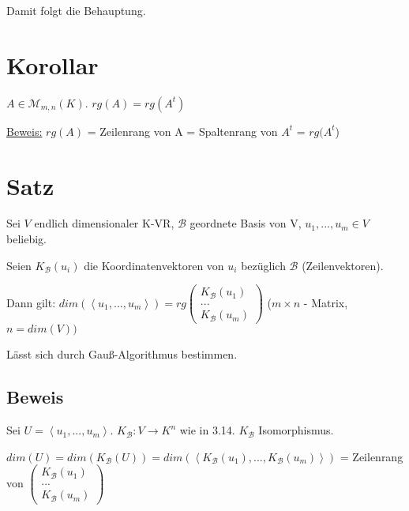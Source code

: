 \documentclass[a4paper, openany]{book}
\begin{document}
        Damit folgt die Behauptung.

        \section{Korollar}

        $A \in \mathcal{M}_{m,n} (K)$. $rg(A) = rg(A^t)$

        \par \medskip

        \underline{Beweis:} $rg(A)$ = Zeilenrang von A = Spaltenrang von $A^t$ = $rg(A^t$)

        \section{Satz}

        Sei $V$ endlich dimensionaler K-VR, $\mathcal{B}$ geordnete Basis von V, $u_1, ..., u_m \in V$ beliebig.

        Seien $K_{\mathcal{B}}(u_i)$ die Koordinatenvektoren von $u_i$ bezüglich $\mathcal{B}$ (Zeilenvektoren).

        \par \medskip

        Dann gilt: $dim(\left \langle u_1, ..., u_m \right \rangle) = rg\begin{pmatrix}K_{\mathcal{B}}(u_1) \\ ... \\ K_{\mathcal{B}}(u_m) \end{pmatrix}$ ($m \times n$ - Matrix, $n = dim(V))$

        \par \medskip
        
        Lässt sich durch Gauß-Algorithmus bestimmen.

        \subsection{Beweis}

        Sei $U = \left \langle u_1, ..., u_m \right \rangle$. $K_{\mathcal{B}} : V \rightarrow K^n$ wie in 3.14. $K_{\mathcal{B}}$ Isomorphismus.

        \par \medskip

        $dim(U) = dim(K_{\mathcal{B}}(U)) = dim(\left \langle K_{\mathcal{B}}(u_1), ..., K_{\mathcal{B}}(u_m) \right \rangle)$ = Zeilenrang von $\begin{pmatrix}K_{\mathcal{B}}(u_1) \\ ... \\ K_{\mathcal{B}}(u_m) \end{pmatrix}$
\end{document}
